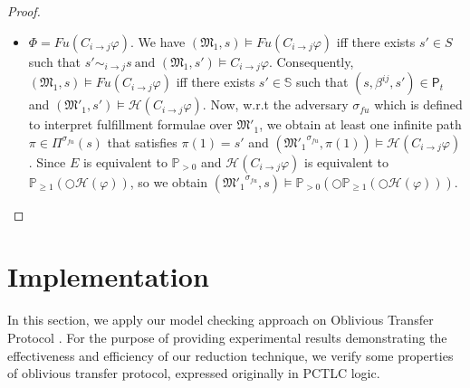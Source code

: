 \begin{proof}
\begin{itemize}
\item $\Phi = Fu(C_{i \rightarrow j} \varphi)$. We have
$(\mathfrak{M_1},s)\models Fu(C_{i\rightarrow j}\varphi)$ iff there
exists $s'\in S$ such that $s'\sim_{i \rightarrow j}s~
\text{and~}(\mathfrak{M_1},s')\models C_{i \rightarrow j}\varphi$.
Consequently, $(\mathfrak{M_1},s)\models Fu(C_{i\rightarrow
j}\varphi)$ iff there exists $s' \in \mathbb{S}$ such that
$(s,\beta^{ij},s') \in \textsf{P}_t$ and
$(\mathfrak{M'_1},s') \models \mathscr{H}(C_{i \rightarrow
j}\varphi)$. Now, w.r.t the adversary $\sigma_{fu}$ which is
defined to interpret fulfillment formulae over
$\mathfrak{M'_1}$, we obtain at least one infinite path $\pi
\in \Pi^{\sigma_{fu}}(s)$ that satisfies $\pi(1)=s'$ and
$(\mathfrak{M'_1}^{\sigma_{fu}},\pi(1))\models
\mathscr{H}(C_{i \rightarrow j}\varphi)$. Since $E$ is equivalent
to $\mathbb{P}_{>0}$ and $\mathscr{H}(C_{i \rightarrow j}\varphi)$
is equivalent to
$\mathbb{P}_{\geq1}(\bigcirc\mathscr{H}(\varphi))$, so we obtain
$(\mathfrak{M'_1}^{\sigma_{fu}},s)\models
\mathbb{P}_{>0}(\bigcirc\mathbb{P}_{\geq 1}(\bigcirc
\mathscr{H}(\varphi)))$.



\end{itemize}

\end{proof}


\vspace{-1.0cm}
\section{Implementation} \label{sec:implementaion PCTLC}

In this section, we apply our model checking approach on Oblivious Transfer Protocol \cite{Rivest1999}. For the purpose of providing experimental results demonstrating the effectiveness and efficiency of our reduction technique, we verify some properties of oblivious transfer protocol, expressed originally in PCTLC logic.


